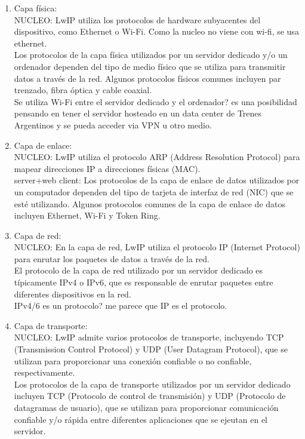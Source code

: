 \begin{enumerate}

  \item Capa física:
      \\
NUCLEO:     LwIP utiliza los protocolos de hardware subyacentes del dispositivo, como Ethernet o Wi-Fi. Como la nucleo no viene con wi-fi, se usa ethernet.
      \\
      Los protocolos de la capa física utilizados por un servidor dedicado y/o un ordenador dependen del tipo de medio físico que se utiliza para transmitir datos a través de la red. Algunos protocolos físicos comunes incluyen par trenzado, fibra óptica y cable coaxial.
      \\ 
      Se utiliza Wi-Fi entre el servidor dedicado y el ordenador? es una posibilidad pensando en tener el servidor hosteado en un data center de Trenes Argentinos y se pueda acceder via VPN u otro medio.


  \item Capa de enlace: 
    \\
 NUCLEO:   LwIP utiliza el protocolo ARP (Address Resolution Protocol) para mapear direcciones IP a direcciones físicas (MAC). 
    \\
    server+web client: Los protocolos de la capa de enlace de datos utilizados por un computador dependen del tipo de tarjeta de interfaz de red (NIC) que se esté utilizando. Algunos protocolos comunes de la capa de enlace de datos incluyen Ethernet, Wi-Fi y Token Ring.
      

  \item Capa de red:
    \\
 NUCLEO:   En la capa de red, LwIP utiliza el protocolo IP (Internet Protocol) para enrutar los paquetes de datos a través de la red.
    \\
    El protocolo de la capa de red utilizado por un servidor dedicado es típicamente IPv4 o IPv6, que es responsable de enrutar paquetes entre diferentes dispositivos en la red.
    \\
    IPv4/6 es un protocolo? me parece que IP es el protocolo.


  \item Capa de transporte:
    \\
 NUCLEO:   LwIP admite varios protocolos de transporte, incluyendo TCP (Transmission Control Protocol) y UDP (User Datagram Protocol), que se utilizan para proporcionar una conexión confiable o no confiable, respectivamente.
    \\
  Los protocolos de la capa de transporte utilizados por un servidor dedicado incluyen TCP (Protocolo de control de transmisión) y UDP (Protocolo de datagramas de usuario), que se utilizan para proporcionar comunicación confiable y/o rápida entre diferentes aplicaciones que se ejeutan en el servidor.



\end{enumerate}
